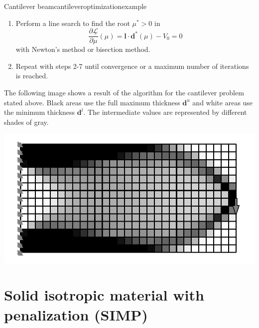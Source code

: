 \begin{example}{Cantilever beam}{cantileveroptimizationexample}
\begin{enumerate}
\begin{align}
{{                (L^k_j-d^k_j)^2}{\mu l_j}} \\
                \mathbf{d}^* (\mu) &= \max\left(\tilde{\mathbf{d}}^{l,k}, \min \left(\hat{\mathbf{d}}(\mu), \mathbf{d}_u \right)\right)
            \end{align}
        \item Perform a line search to find the root $\mu^*>0$ in 
        \begin{equation}
            \frac{\partial \underline{\mathcal{L}}}{\partial \mu}(\mu) = \mathbf{l} \cdot \mathbf{d}^* (\mu) - V_0  = 0
        \end{equation}
        with Newton's method or bisection method. 
        \item Repeat with steps 2-7 until convergence or a maximum number of iterations is reached.
    \end{enumerate}

    The following image shows a result of the algorithm for the cantilever problem stated above. Black areas use the full maximum thickness $\mathbf{d}^u$ and white areas use the minimum thickness $\mathbf{d}^l$. The intermediate values are represented by different shades of gray.
    
    \includegraphics[width=0.9\linewidth]{figures/cantilever_fem_optimized.pdf}
       
\end{example}

\section{Solid isotropic material with penalization (SIMP)}

